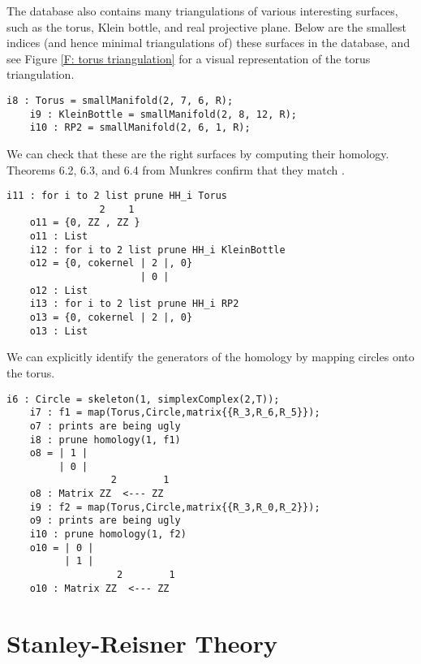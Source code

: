 \documentclass[12pt,leqno]{amsart}
\theoremstyle{definition}
\newenvironment{example}
{\pushQED{\qed}\renewcommand{\qedsymbol}{$\diamond$}\examplex}
{\popQED\endexamplex}
\begin{document}
The database also contains many triangulations of various interesting surfaces, such as the torus, Klein bottle, and real projective plane. Below are the smallest indices (and hence minimal triangulations of) these surfaces in the database, and see Figure \ref{F: torus triangulation} for a visual representation of the torus triangulation.

\begin{example}\label{E: common surfaces and homology}
  \begin{lstlisting}[basicstyle={\ttfamily \scriptsize}, xleftmargin=-23pt]
    i8 : Torus = smallManifold(2, 7, 6, R);
    i9 : KleinBottle = smallManifold(2, 8, 12, R);
    i10 : RP2 = smallManifold(2, 6, 1, R);
  \end{lstlisting}
  We can check that these are the right surfaces by computing their homology. Theorems 6.2, 6.3, and 6.4 from Munkres confirm that they match \cite{Munkres}.
  \begin{lstlisting}[basicstyle={\ttfamily \scriptsize}, xleftmargin=-23pt]
    i11 : for i to 2 list prune HH_i Torus
                2    1
    o11 = {0, ZZ , ZZ }
    o11 : List
    i12 : for i to 2 list prune HH_i KleinBottle
    o12 = {0, cokernel | 2 |, 0}
                       | 0 |
    o12 : List
    i13 : for i to 2 list prune HH_i RP2
    o13 = {0, cokernel | 2 |, 0}
    o13 : List
\end{lstlisting}
  We can explicitly identify the generators of the homology by mapping circles onto the torus.
  \begin{lstlisting}[basicstyle={\ttfamily \scriptsize}, xleftmargin=-23pt]
    i6 : Circle = skeleton(1, simplexComplex(2,T));
    i7 : f1 = map(Torus,Circle,matrix{{R_3,R_6,R_5}});
    o7 : prints are being ugly
    i8 : prune homology(1, f1)
    o8 = | 1 |
         | 0 |
                  2        1
    o8 : Matrix ZZ  <--- ZZ
    i9 : f2 = map(Torus,Circle,matrix{{R_3,R_0,R_2}});
    o9 : prints are being ugly
    i10 : prune homology(1, f2)
    o10 = | 0 |
          | 1 |
                   2        1
    o10 : Matrix ZZ  <--- ZZ
  \end{lstlisting}
\end{example}

\section{Stanley-Reisner Theory}
\label{S:Stanley-Reisner Theory}
\end{document}

